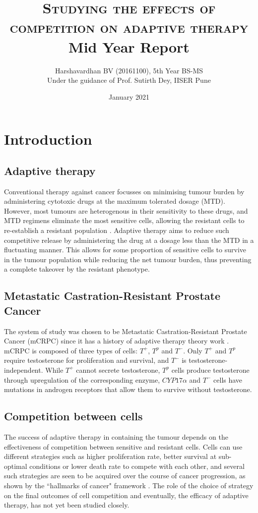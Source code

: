 \documentclass[a4paper]{article}
\title{\textsc{Studying the effects of competition on adaptive therapy}\\\Large{Mid Year Report}}
\author{Harshavardhan BV (20161100), 5th Year BS-MS\\
Under the guidance of Prof. Sutirth Dey, IISER Pune}
\date{January 2021}
\begin{document}
\maketitle

\section{Introduction}
\subsection{Adaptive therapy}
Conventional therapy against cancer focusses on minimising tumour burden by administering cytotoxic drugs at the maximum tolerated dosage (MTD). However, most tumours are heterogenous in their sensitivity to these drugs, and MTD regimens eliminate the most sensitive cells, allowing the resistant cells to re-establish a resistant population \cite{Scott}. Adaptive therapy aims to reduce such competitive release by administering the drug at a dosage less than the MTD in a fluctuating manner. This allows for some proportion of sensitive cells to survive in the tumour population while reducing the net tumour burden, thus preventing a complete takeover by the resistant phenotype.

\subsection{Metastatic Castration-Resistant Prostate Cancer}
The system of study was chosen to be Metastatic Castration-Resistant Prostate Cancer (mCRPC) since it has a history of adaptive therapy theory work \cite{Cunningham}. mCRPC is composed of three types of cells: $T^+$, $T^p$ and $T^-$. Only $T^+$ and $T^p$ require testosterone for proliferation and survival, and $T^-$ is testosterone-independent. While $T^+$ cannot secrete testosterone, $T^p$ cells produce testosterone through upregulation of the corresponding enzyme, $CYP17\alpha$ and $T^-$ cells have mutations in androgen receptors that allow them to survive without testosterone.

\subsection{Competition between cells}
The success of adaptive therapy in containing the tumour depends on the effectiveness of competition between sensitive and resistant cells. Cells can use different strategies such as higher proliferation rate, better survival at sub-optimal conditions or lower death rate to compete with each other, and several such strategies are seen to be acquired over the course of cancer progression, as shown by the ``hallmarks of cancer" framework \cite{Hanahan}. The role of the choice of strategy on the final outcomes of cell competition and eventually, the efficacy of adaptive therapy, has not yet been studied closely.
\end{document}
